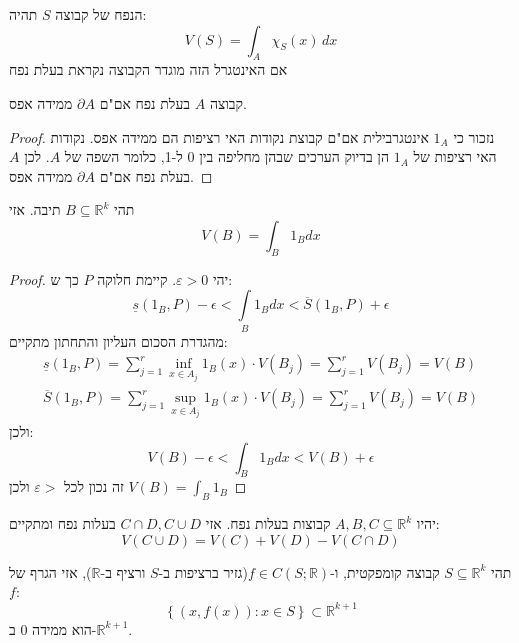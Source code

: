 \documentclass{tstextbook}
\begin{document}
\begin{definition}
הנפח של קבוצה \(S\) תהיה:
$$V(S)=\int_{A}\!\chi_{S}(x)\,d x$$
אם האינטגרל הזה מוגדר הקבוצה נקראת בעלת נפח

\end{definition}
\begin{proposition}
קבוצה \(A\) בעלת נפח אם"ם \(\partial A\) ממידה אפס.

\end{proposition}
\begin{proof}
נזכור כי \(1_{A}\) אינטגרבילית אם"ם קבוצת נקודות האי רציפות הם ממידה אפס. נקודות האי רציפות של \(1_{A}\) הן בדיוק הערכים שבהן מחליפה בין 0 ל-1, כלומר השפה של \(A\). לכן \(A\) בעלת נפח אם"ם \(\partial A\) ממידה אפס.

\end{proof}
\begin{proposition}
תהי \(B\subseteq \mathbb{R}^k\) תיבה. אזי $$V(B)=\int_{B}1_{B}d x$$

\end{proposition}
\begin{proof}
יהי \(\varepsilon>0\). קיימת חלוקה \(P\) כך ש:
$$\underline{{{s}}}(1_{B},P)-\epsilon<\int\limits_{B}1_{B}d x<\overline{{{S}}}(1_{B},P)+\epsilon$$
מהגדרת הסכום העליון והתחתון מתקיים:
$$\begin{array}{l}{{\underline{{s}}(1_{B},P)=\displaystyle\sum_{j=1}^{r}\operatorname*{inf}_{x\in A_{j}}1_{B}(x)\cdot V(B_{j})=\displaystyle\sum_{j=1}^{r}V(B_{j})=V(B)}}\\ {{\overline{{S}}(1_{B},P)=\displaystyle\sum_{j=1}^{r}\operatorname*{sup}_{x\in A_{j}}1_{B}(x)\cdot V(B_{j})=\displaystyle\sum_{j=1}^{r}V(B_{j})=V(B)}}\end{array}$$
ולכן:
$$V(B)-\epsilon<\int_{B}1_{B}d x<V(B)+\epsilon$$
זה נכון לכל \(\varepsilon>\) ולכן \(V(B)=\int_{B}1_{B}\)

\end{proof}
\begin{proposition}
יהיו \(A,B,C\subseteq \mathbb{R}^k\) קבוצות בעלות נפח. אזי \(C\cap D, C \cup D\) בעלות נפח ומתקיים:
$$V\left(C\cup D\right)=V\left(C\right)+V\left(D\right)-V\left(C\cap D\right)$$

\end{proposition}
\begin{proposition}
תהי \(S\subseteq \mathbb{R}^k\) קבוצה קומפקטית, ו-\(f\in C\left( S;\mathbb{R} \right)\)(גזיר ברציפות ב-\(S\) ורציף ב-\(\mathbb{R}\)), אזי הגרף של \(f\):
$$\left\{\left(x,f\left(x\right)\right):x\in S\right\}\subset\mathbb{R}^{k+1}$$
הוא ממידה 0 ב-\(\mathbb{R}^{k+1}\).

\end{proposition}
\end{document}
